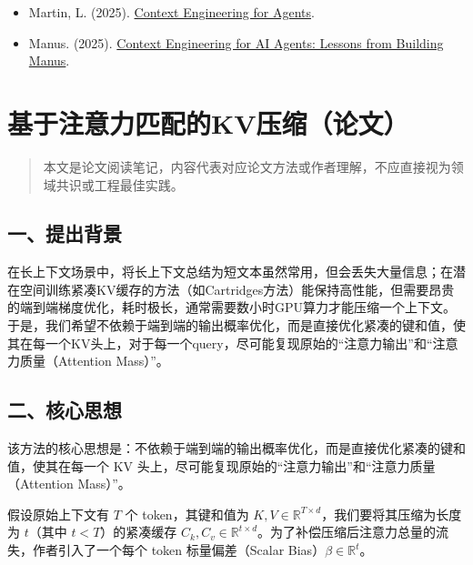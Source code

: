 \begin{itemize}
\tightlist
\item
  Martin, L. (2025). \href{https://rlancemartin.github.io/2025/10/15/manus/}{Context Engineering for Agents}.
\item
  Manus. (2025). \href{https://manus.im/zh-cn/blog/Context-Engineering-for-AI-Agents-Lessons-from-Building-Manus}{Context Engineering for AI Agents: Lessons from Building Manus}.
\end{itemize}

\clearpage

\hypertarget{ux57faux4e8eux6ce8ux610fux529bux5339ux914dux7684kvux538bux7f29ux8bbaux6587}{%
\section{基于注意力匹配的KV压缩（论文）}\label{ux57faux4e8eux6ce8ux610fux529bux5339ux914dux7684kvux538bux7f29ux8bbaux6587}}

\begin{quote}
本文是论文阅读笔记，内容代表对应论文方法或作者理解，不应直接视为领域共识或工程最佳实践。
\end{quote}

\hypertarget{ux4e00ux63d0ux51faux80ccux666f-3}{%
\subsection{一、提出背景}\label{ux4e00ux63d0ux51faux80ccux666f-3}}

在长上下文场景中，将长上下文总结为短文本虽然常用，但会丢失大量信息；在潜在空间训练紧凑KV缓存的方法（如Cartridges方法）能保持高性能，但需要昂贵的端到端梯度优化，耗时极长，通常需要数小时GPU算力才能压缩一个上下文。于是，我们希望不依赖于端到端的输出概率优化，而是直接优化紧凑的键和值，使其在每一个KV头上，对于每一个query，尽可能复现原始的``注意力输出''和``注意力质量（Attention Mass）''。

\hypertarget{ux4e8cux6838ux5fc3ux601dux60f3-3}{%
\subsection{二、核心思想}\label{ux4e8cux6838ux5fc3ux601dux60f3-3}}

该方法的核心思想是：不依赖于端到端的输出概率优化，而是直接优化紧凑的键和值，使其在每一个 KV 头上，尽可能复现原始的``注意力输出''和``注意力质量（Attention Mass）''。

假设原始上下文有 \(T\) 个 token，其键和值为 \(K,V \in \mathbb{R}^{T \times d}\)，我们要将其压缩为长度为 \(t\)（其中 \(t<T\)）的紧凑缓存 \(C_k,C_v \in \mathbb{R}^{t \times d}\)。为了补偿压缩后注意力总量的流失，作者引入了一个每个 token 标量偏差（Scalar Bias）\(\beta \in \mathbb{R}^{t}\)。

